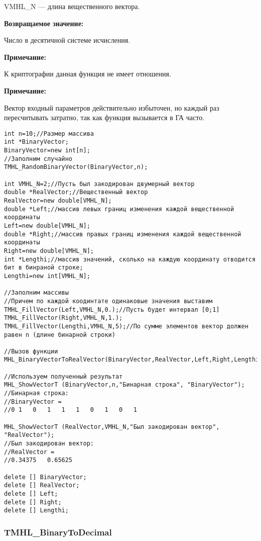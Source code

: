 \documentclass[a4paper,12pt]{article}
\begin{document}
VMHL\_N --- длина вещественного вектора.

\textbf{Возвращаемое значение:}
 
Число в десятичной системе исчисления.

\textbf{Примечание:}

 К криптографии данная функция не имеет отношения.
 
\textbf{Примечание:}

 Вектор входный параметров действительно избыточен, но каждый раз пересчитывать затратно, так как функция вызывается в ГА часто.


\begin{lstlisting}[label=code_use_MHL_BinaryVectorToRealVector,caption=Пример использования]
int n=10;//Размер массива
int *BinaryVector;
BinaryVector=new int[n];
//Заполним случайно
TMHL_RandomBinaryVector(BinaryVector,n);

int VMHL_N=2;//Пусть был закодирован двумерный вектор
double *RealVector;//Вещественный вектор
RealVector=new double[VMHL_N];
double *Left;//массив левых границ изменения каждой вещественной координаты
Left=new double[VMHL_N];
double *Right;//массив правых границ изменения каждой вещественной координаты
Right=new double[VMHL_N];
int *Lengthi;//массив значений, сколько на каждую координату отводится бит в бинраной строке;
Lengthi=new int[VMHL_N];

//Заполним массивы
//Причем по каждой коодинтате одинаковые значения выставим
TMHL_FillVector(Left,VMHL_N,0.);//Пусть будет интервал [0;1]
TMHL_FillVector(Right,VMHL_N,1.);
TMHL_FillVector(Lengthi,VMHL_N,5);//По сумме элементов вектор должен равен n (длине бинарной строки)

//Вызов функции
MHL_BinaryVectorToRealVector(BinaryVector,RealVector,Left,Right,Lengthi,VMHL_N);

//Используем полученный результат
MHL_ShowVectorT (BinaryVector,n,"Бинарная строка", "BinaryVector");
//Бинарная строка:
//BinaryVector =	
//0	1	0	1	1	1	0	1	0	1

MHL_ShowVectorT (RealVector,VMHL_N,"Был закодирован вектор", "RealVector");
//Был закодирован вектор:
//RealVector =	
//0.34375	0.65625

delete [] BinaryVector;
delete [] RealVector;
delete [] Left;
delete [] Right;
delete [] Lengthi;
\end{lstlisting}

\subsubsection{TMHL\_BinaryToDecimal}\label{TMHL_BinaryToDecimal}
\end{document}
